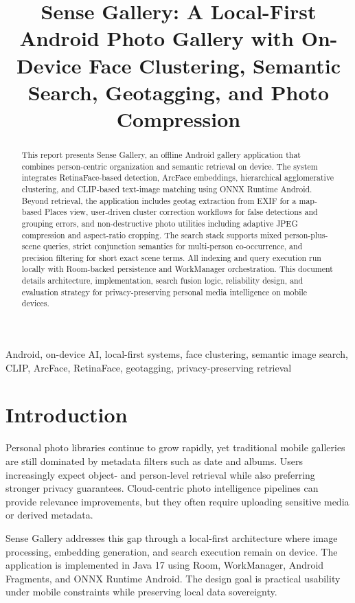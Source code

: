 \documentclass[conference]{IEEEtran}
\title{Sense Gallery: A Local-First Android Photo Gallery with On-Device Face Clustering, Semantic Search, Geotagging, and Photo Compression}
\author{
\IEEEauthorblockN{Your Name}
\IEEEauthorblockA{
Department of Computer Science and Engineering\\
Your Institute Name\\
City, Country\\
email@domain.com}
}
\begin{document}
\maketitle

\begin{abstract}
This report presents Sense Gallery, an offline Android gallery application that combines person-centric organization and semantic retrieval on device. The system integrates RetinaFace-based detection, ArcFace embeddings, hierarchical agglomerative clustering, and CLIP-based text-image matching using ONNX Runtime Android. Beyond retrieval, the application includes geotag extraction from EXIF for a map-based Places view, user-driven cluster correction workflows for false detections and grouping errors, and non-destructive photo utilities including adaptive JPEG compression and aspect-ratio cropping. The search stack supports mixed person-plus-scene queries, strict conjunction semantics for multi-person co-occurrence, and precision filtering for short exact scene terms. All indexing and query execution run locally with Room-backed persistence and WorkManager orchestration. This document details architecture, implementation, search fusion logic, reliability design, and evaluation strategy for privacy-preserving personal media intelligence on mobile devices.
\end{abstract}

\begin{IEEEkeywords}
Android, on-device AI, local-first systems, face clustering, semantic image search, CLIP, ArcFace, RetinaFace, geotagging, privacy-preserving retrieval
\end{IEEEkeywords}

\section{Introduction}
Personal photo libraries continue to grow rapidly, yet traditional mobile galleries are still dominated by metadata filters such as date and albums. Users increasingly expect object- and person-level retrieval while also preferring stronger privacy guarantees. Cloud-centric photo intelligence pipelines can provide relevance improvements, but they often require uploading sensitive media or derived metadata.

Sense Gallery addresses this gap through a local-first architecture where image processing, embedding generation, and search execution remain on device. The application is implemented in Java 17 using Room, WorkManager, Android Fragments, and ONNX Runtime Android. The design goal is practical usability under mobile constraints while preserving local data sovereignty.
\end{document}
